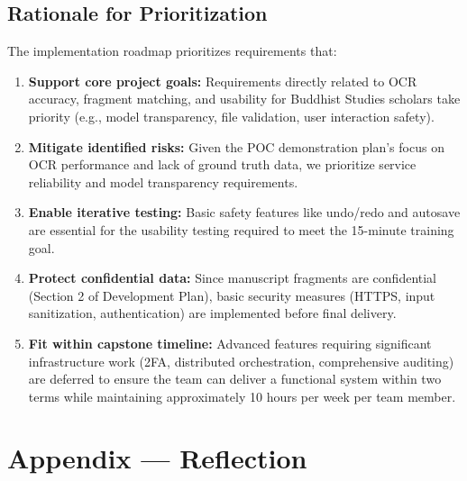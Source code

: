 \documentclass{article}
\begin{document}
\subsection{Rationale for Prioritization}

The implementation roadmap prioritizes requirements that:

\begin{enumerate}
    \item \textbf{Support core project goals:} Requirements directly related to OCR accuracy, fragment matching, and usability for Buddhist Studies scholars take priority (e.g., model transparency, file validation, user interaction safety).

    \item \textbf{Mitigate identified risks:} Given the POC demonstration plan's focus on OCR performance and lack of ground truth data, we prioritize service reliability and model transparency requirements.

    \item \textbf{Enable iterative testing:} Basic safety features like undo/redo and autosave are essential for the usability testing required to meet the 15-minute training goal.

    \item \textbf{Protect confidential data:} Since manuscript fragments are confidential (Section 2 of Development Plan), basic security measures (HTTPS, input sanitization, authentication) are implemented before final delivery.

    \item \textbf{Fit within capstone timeline:} Advanced features requiring significant infrastructure work (2FA, distributed orchestration, comprehensive auditing) are deferred to ensure the team can deliver a functional system within two terms while maintaining approximately 10 hours per week per team member.
\end{enumerate}

\newpage{}

\section*{Appendix --- Reflection}
\end{document}
